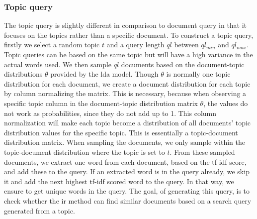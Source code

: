 \subsubsection{Topic query}\label{subsec:query_gen_top}
The topic query is slightly different in comparison to document query in that it focuses on the topics rather than a specific document.
To construct a topic query, firstly we select a random topic $t$ and a query length $ql$ between $ql_{min}$ and $ql_{max}$.
Topic queries can be based on the same topic but will have a high variance in the actual words used.
We then sample $ql$ documents based on the document-topic distributions $\theta$ provided by the \gls{lda} model.
Though $\theta$ is normally one topic distribution for each document, we create a document distribution for each topic by column normalizing the matrix.
This is necessary, because when observing a specific topic column in the document-topic distribution matrix $\theta$, the values do not work as probabilities, since they do not add up to 1.
This column normalization will make each topic become a distribution of all documents' topic distribution values for the specific topic.
This is essentially a topic-document distribution matrix.
When sampling the documents, we only sample within the topic-document distribution where the topic is set to $t$.
From these sampled documents, we extract one word from each document, based on the \gls{tf-idf} score, and add these to the query.
If an extracted word is in the query already, we skip it and add the next highest \gls{tf-idf} scored word to the query.
In that way, we ensure to get unique words in the query.
The goal, of generating this query, is to check whether the \gls{ir} method can find similar documents based on a search query generated from a topic.

 
